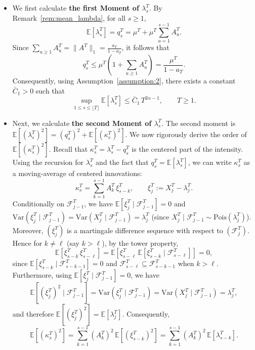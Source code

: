 \documentclass[letterpaper]{article}
\numberwithin{equation}{section}
\theoremstyle{definition}
\theoremstyle{remark}
\begin{document}
\begin{itemize}
    \item We first calculate \textbf{the first Moment of $\lambda_s^T$}. {By Remark~\ref{rem:mean_lambda}, for all $s\ge1$,
    \[
    \mathbb E[\lambda_s^T]=q_s^T=\mu^T+\mu^T\sum_{u=1}^{s-1}A_u^T.
    \]
    Since $\sum_{u\ge1}A_u^T=\|A^T\|_1=\frac{a_T}{1-a_T}$, it follows that
    \[
    q_s^T\le \mu^T\left(1+\sum_{u\ge1}A_u^T\right)=\frac{\mu^T}{1-a_T}.
    \]
    Consequently, using Assumption~\ref{assumption:2}, there exists a constant $\bar C_1>0$ such that
    \begin{equation}\label{eq:suplambdasbound}
    \sup_{1\le s\le \lfloor T\rfloor}\mathbb E[\lambda_s^T]\le \bar C_1\,T^{2\alpha-1},\qquad T\ge1.
    \end{equation}
    }

    \item Next, we calculate \textbf{the second Moment of $\lambda_s^T$}. The second moment is $\mathbb E[(\lambda_s^T)^2] = (q_s^T)^2 + \mathbb E[(\kappa_s^T)^2]$. We now rigorously derive the order of $\mathbb E[(\kappa_s^T)^2]$. {Recall that $\kappa_s^T=\lambda_s^T-q_s^T$ is the centered part of the intensity.
    Using the recursion for $\lambda_s^T$ and the fact that $q_s^T=\mathbb E[\lambda_s^T]$, we can write $\kappa_s^T$ as a moving-average of centered innovations:
    \[
      \kappa_s^T=\sum_{k=1}^{s-1}A_k^T\,\xi_{s-k}^T,
      \qquad
      \xi_j^T:=X_j^T-\lambda_j^T .
    \]
    Conditionally on $\mathcal F_{j-1}^T$, we have $\mathbb E [\xi_j^T\mid\mathcal F_{j-1}^T]=0$ and
    $\mathrm{Var}(\xi_j^T\mid\mathcal F_{j-1}^T)=\mathrm{Var}(X_j^T\mid\mathcal F_{j-1}^T)=\lambda_j^T$
    (since $X_j^T\mid\mathcal F_{j-1}^T\sim\mathrm{Pois}(\lambda_j^T)$).
    Moreover, $(\xi_j^T)$ is a martingale difference sequence with respect to $(\mathcal F_j^T)$.
    Hence for $k\neq \ell$ (say $k>\ell$), by the tower property,
    \[
      \mathbb E[\xi_{s-k}^T\,\xi_{s-\ell}^T]
      =\mathbb E\!\left[\xi_{s-\ell}^T\,\mathbb E[\xi_{s-k}^T\mid \mathcal F_{s-\ell}^T]\right]=0,
    \]
    since $\mathbb E[\xi_{s-k}^T\mid \mathcal F_{s-k-1}^T]=0$ and $\mathcal F_{s-\ell}^T\subseteq \mathcal F_{s-k-1}^T$ when $k>\ell$.
    Furthermore, using $\mathbb E[\xi_j^T\mid\mathcal F_{j-1}^T]=0$, we have
    \[
      \mathbb E[(\xi_j^T)^2\mid\mathcal F_{j-1}^T]=\mathrm{Var}(\xi_j^T\mid\mathcal F_{j-1}^T)
      =\mathrm{Var}(X_j^T\mid\mathcal F_{j-1}^T)=\lambda_j^T,
    \]
    and therefore $\mathbb E[(\xi_j^T)^2]=\mathbb E[\lambda_j^T]$.
    Consequently,
    \[
      \mathbb E[(\kappa_s^T)^2]
      =\sum_{k=1}^{s-1}(A_k^T)^2\,\mathbb E[(\xi_{s-k}^T)^2]
      =\sum_{k=1}^{s-1}(A_k^T)^2\,\mathbb E[\lambda_{s-k}^T].
    \]
    }


\end{itemize}
\end{document}

